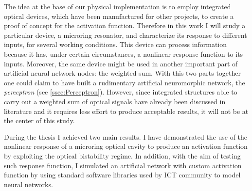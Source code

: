 The idea at the base of our physical implementation is to employ integrated optical devices, which have been manufactured for other projects, to create a proof of concept for the activation function.
Therefore in this work I will study a particular device, a microring resonator, and characterize its response to different inputs, for several working conditions.
This device can process information because it has, under certain circumstances, a nonlinear response function to its inputs.
Moreover, the same device might be used in another important part of artificial neural network nodes: the weighted sum.
With this two parts together one could claim to have built a rudimentary artificial neuromorphic network, the \textit{perceptron} (see \autoref{ssec:Perceptron}).
However, since integrated structures able to carry out a weighted sum of optical signals have already been discussed in literature and it requires less effort to produce acceptable results, it will not be at the center of this study.

During the thesis I achieved two main results.
I have demonstrated the use of the nonlinear response of a microring optical cavity to produce an activation function by exploiting the optical bistability regime.
In addition, with the aim of testing such response function, I simulated an artificial network with custom activation function by using standard software libraries used by ICT community to model neural networks.


